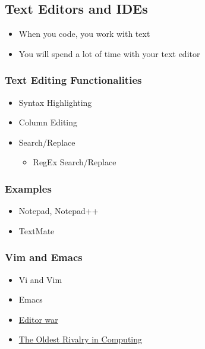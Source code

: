 \documentclass[10pt,article]{article}
\begin{document}
\subsection{Text Editors and IDEs}
\label{sec:org536b148}
\begin{itemize}
\item When you code, you work with text
\item You will spend a lot of time with your text editor
\end{itemize}
\subsubsection{Text Editing Functionalities}
\label{sec:orgee2ea93}
\begin{itemize}
\item Syntax Highlighting
\item Column Editing
\item Search/Replace

\begin{itemize}
\item RegEx Search/Replace
\end{itemize}
\end{itemize}
\subsubsection{Examples}
\label{sec:orgd988253}
\begin{multicols}{2}
\begin{itemize}
\item Notepad, Notepad++
\item TextMate
\end{itemize}
\end{multicols}

\subsubsection{Vim and Emacs}
\label{sec:org4e0d949}
\begin{itemize}
\item Vi and Vim
\item Emacs
\item \href{http://en.wikipedia.org/wiki/Editor\_war\#Humor}{Editor war}
\item \href{http://www.slate.com/articles/technology/bitwise/2014/05/oldest\_software\_rivalry\_emacs\_and\_vi\_two\_text\_editors\_used\_by\_programmers.html}{The Oldest Rivalry in Computing}
\end{itemize}
\end{document}
